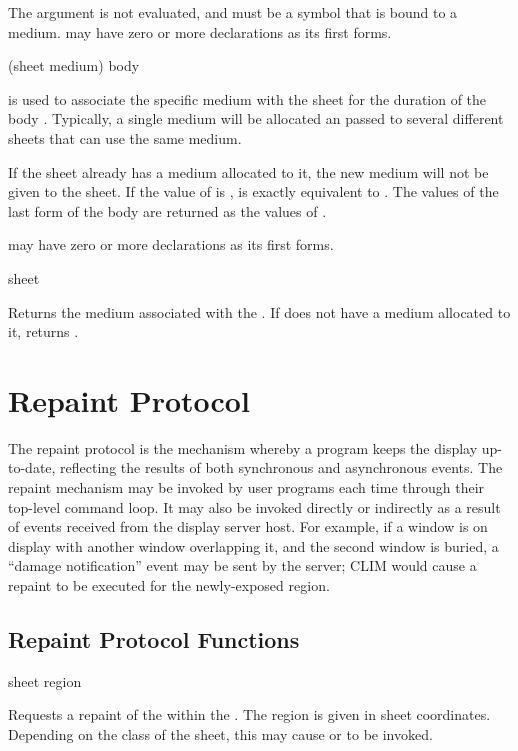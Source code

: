 The  argument is not evaluated, and must be a symbol that is bound
to a medium.   may have zero or more declarations as its first forms.

 {(sheet medium) \body body}

 is used to associate the specific medium
 with the sheet  for the duration of the body .
Typically, a single medium will be allocated an passed to several different
sheets that can use the same medium.

If the sheet already has a medium allocated to it, the new medium will not be
given to the sheet.  If the value of  is ,
 is exactly equivalent to .
The values of the last form of the body are returned as the values of
.

 may have zero or more declarations as its first forms.

 {sheet}

Returns the medium associated with the  .  If 
does not have a medium allocated to it,  returns .


\section {Repaint Protocol}

The repaint protocol is the mechanism whereby a program keeps the display
up-to-date, reflecting the results of both synchronous and asynchronous events.
The repaint mechanism may be invoked by user programs each time through their
top-level command loop.  It may also be invoked directly or indirectly as a
result of events received from the display server host.  For example, if a
window is on display with another window overlapping it, and the second window
is buried, a ``damage notification'' event may be sent by the server; CLIM would
cause a repaint to be executed for the newly-exposed region.


\subsection {Repaint Protocol Functions}

 {sheet region}

Requests a repaint of the   within the 
.  The region is given in sheet coordinates.  Depending on the class
of the sheet, this may cause  or  to be
invoked.

